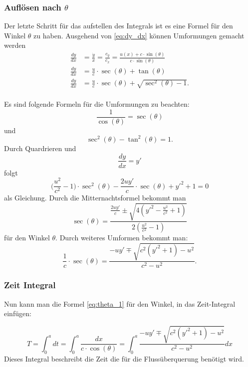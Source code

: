 \subsubsection{Auflösen nach \(\theta\)}

Der letzte Schritt für das aufstellen des Integrals ist es eine Formel für den Winkel \(\theta\) zu haben.
Ausgehend von \eqref{eq:dy_dx} können Umformungen gemacht werden
\begin{align}
    \frac{dy}{dx} &= \frac{\dot{y}}{\dot{x}} = \frac{c_y}{c_x} = \frac{u(x) + c \cdot \sin(\theta)}{c \cdot \sin(\theta)} \\
    \frac{dy}{dx} &= \frac{u}{c}\cdot \sec(\theta) + \tan(\theta) \\
    \frac{dy}{dx} &= \frac{u}{c}\cdot \sec(\theta) + \sqrt{\sec^2(\theta)-1}. \\
\end{align}

Es sind folgende Formeln für die Umformungen zu beachten: \[\frac{1}{\cos(\theta)} = \sec(\theta)\] und \[\sec^2(\theta)-\tan^2(\theta) = 1.\] Durch Quardrieren und \[\frac{dy}{dx} = y'\] folgt 
\begin{equation}
    \biggl(\frac{u^2}{c^2}-1 \biggr) \cdot \sec^2(\theta) - \frac{2uy'}{c}\cdot \sec(\theta) + y'^2 +1 = 0
\end{equation}
als Gleichung. Durch die Mitternachtsformel bekommt man 
\begin{equation}
    \sec(\theta) = \frac{\frac{2uy'}{c} \pm \sqrt{4(y'^2-\frac{u^2}{c^2} + 1)}}{2(\frac{u^2}{c^2}-1)}
\end{equation}
für den Winkel \(\theta\). Durch weiteres Umformen bekommt man:
\begin{equation}
    \frac{1}{c}\cdot \sec(\theta) = \frac{-uy' \mp \sqrt{c^2(y'^2+1)-u^2}}{c^2-u^2} .\label{eq:theta_1}
\end{equation}


\subsubsection{Zeit Integral}

Nun kann man die Formel \eqref{eq:theta_1} für den Winkel, in das Zeit-Integral einfügen:

\begin{equation}
    T = \int_0^adt = \int_0^a\frac{dx}{c\cdot \cos(\theta)} = \int_0^a \frac{-uy' \mp \sqrt{c^2(y'^2+1)-u^2}}{c^2-u^2} dx
    \label{eq:Time_river_2} 
\end{equation}
Dieses Integral  beschreibt die Zeit die für die Flussüberquerung benötigt wird. 



